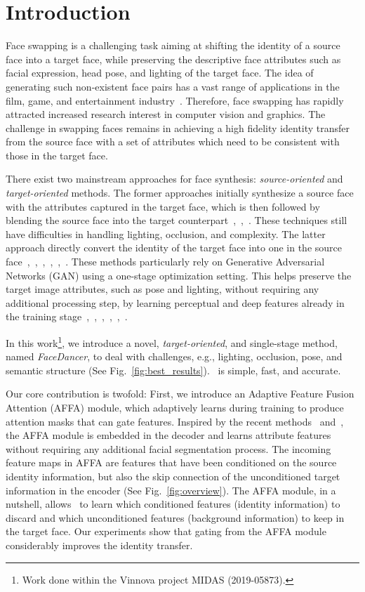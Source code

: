 \documentclass[10pt,twocolumn,letterpaper]{article}
\newcommand{\fti}[1]{\textit{FaceDancer}{#1}}
\begin{document}
\section{Introduction}
Face swapping is a challenging task aiming at shifting the identity of a source face into   a target face, while preserving the descriptive face attributes such as facial expression, head pose, and lighting of the target face. The idea of generating such non-existent face pairs has  a vast range of applications in the film, game, and entertainment industry~\cite{3d_emily}.  Therefore, face swapping has rapidly attracted increased research interest in computer vision and graphics.
The   challenge in   swapping faces remains in achieving a high fidelity identity transfer from the source face with a set of attributes which need to be consistent with those in the target face.

There exist two mainstream approaches for face synthesis: \textit{source-oriented} and \textit{target-oriented} methods. 
The former approaches initially synthesize a source face with the  attributes captured in the target face, which is then followed by blending the source face into the target counterpart~\cite{3d_emily},~\cite{fsgan},~\cite{nirkin}. These techniques still have difficulties in handling lighting, occlusion, and complexity. 
The latter approach directly convert   the identity  of the target face into one in the source face~\cite{simswap},~\cite{faceshifter},~\cite{megaface},~\cite{facecontroller},~\cite{hififace},~\cite{ipgan}.
These methods particularly rely on Generative Adversarial Networks (GAN) using a one-stage optimization setting. This helps preserve the target image attributes, such as pose and lighting, without requiring any additional processing step, \eg by learning perceptual and deep features already in the training stage~\cite{simswap},~\cite{faceshifter},~\cite{spade},~\cite{perceptloss1},~\cite{perceptloss2},~\cite{pix2pixhd}.


In this work\footnote{Work done within the Vinnova project MIDAS (2019-05873).},  we introduce a novel, \textit{target-oriented}, and single-stage method, named \fti, to deal  with    challenges, e.g., lighting, occlusion, pose, and semantic structure (See Fig.~\ref{fig:best_results}). \fti~is simple, fast, and accurate. 

Our core contribution is twofold: First, we introduce an Adaptive Feature Fusion Attention (AFFA) module, which  adaptively learns during training to produce attention masks that can gate features.
Inspired by the recent methods~\cite{faceshifter} and~\cite{hififace}, the AFFA module is embedded in the decoder and learns attribute features without requiring any additional facial segmentation process.  
The incoming feature maps in AFFA are features that have been conditioned on the source identity information, but also the skip connection of the unconditioned target information in the encoder (See Fig.~\ref{fig:overview}).
The AFFA module, in a nutshell, allows \fti~to learn which conditioned features (\eg identity information) to discard and which unconditioned features (\eg background information) to keep in the target face.
Our experiments show that  gating from the AFFA module considerably improves the identity transfer.
\end{document}
